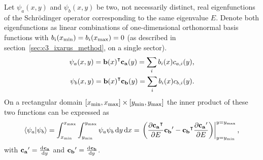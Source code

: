 \begin{theorem}\label{the:c3_dot_product}
  Let $\psi_a(x, y)$ and $\psi_b(x, y)$ be two, not necessarily distinct, real eigenfunctions of the Schrödinger operator corresponding to the same eigenvalue $E$. Denote both eigenfunctions as linear combinations of one-dimensional orthonormal basis functions with $b_i({x_{\text{min}}}) = b_i({x_{\text{max}}}) = 0$ (as described in section~\ref{sec:c3_ixarus_method}, on a single sector).
  \begin{align*}
    \psi_a(x, y) = {\vb{b}(x)}^\intercal \vb{c_a}(y) = \sum_i b_i(x) c_{a, i}(y) \text{,} \\
    \psi_b(x, y) = {\vb{b}(x)}^\intercal \vb{c_b}(y) = \sum_i b_i(x) c_{b, i}(y) \text{.}
  \end{align*}
  On a rectangular domain $[{x_{\text{min}}}, {x_{\text{max}}}] \times [{y_{\text{min}}}, {y_{\text{max}}}]$ the inner product of these two functions can be expressed as
  $$
    \bra{\psi_a}\ket{\psi_b} = \int_{x_{\text{min}}}^{x_{\text{max}}} \int_{y_{\text{min}}}^{y_{\text{max}}} \psi_a\psi_b \, \dd y \, \dd x = \left. \left(\pdv{{\vb{c_a}}^\intercal}{E} \vb{c_b}' - {\vb{c_b}}^\intercal\pdv{\vb{c_a}'}{E} \right) \right|_{y={y_{\text{min}}}}^{y={y_{\text{max}}}} \text{,}
  $$
  with $\vb{c_a}' = \dv[]{\vb{c_a}}{y}$ and $\vb{c_b}' = \dv[]{\vb{c_b}}{y}$.
\end{theorem}
